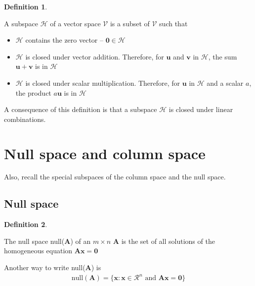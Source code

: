\documentclass[
]{book}
\theoremstyle{definition}
\newtheorem{definition}{Definition}[chapter]
\theoremstyle{definition}
\theoremstyle{definition}
\theoremstyle{remark}
\begin{document}
\begin{definition}
\protect\hypertarget{def:unlabeled-div-116}{}\label{def:unlabeled-div-116}

A subspace \(\mathcal{H}\) of a vector space \(\mathcal{V}\) is a subset of \(\mathcal{V}\) such that

\begin{itemize}
\item
  \(\mathcal{H}\) contains the zero vector -- \(\mathbf{0} \in \mathcal{H}\)
\item
  \(\mathcal{H}\) is closed under vector addition. Therefore, for \(\mathbf{u}\) and \(\mathbf{v}\) in \(\mathcal{H}\), the sum \(\mathbf{u} + \mathbf{v}\) is in \(\mathcal{H}\)
\item
  \(\mathcal{H}\) is closed under scalar multiplication. Therefore, for \(\mathbf{u}\) in \(\mathcal{H}\) and a scalar \(a\), the product \(a \mathbf{u}\) is in \(\mathcal{H}\)
\end{itemize}

\end{definition}

A consequence of this definition is that a subspace \(\mathcal{H}\) is closed under linear combinations.

\hypertarget{null-space-and-column-space}{%
\section{Null space and column space}\label{null-space-and-column-space}}

Also, recall the special subspaces of the column space and the null space.

\hypertarget{null-space}{%
\subsection{Null space}\label{null-space}}

\begin{definition}
\protect\hypertarget{def:unlabeled-div-117}{}\label{def:unlabeled-div-117}

The null space null(\(\mathbf{A}\)) of an \(m \times n\) \(\mathbf{A}\) is the set of all solutions of the homogeneous equation \(\mathbf{A} \mathbf{x} = \mathbf{0}\)

Another way to write null(\(\mathbf{A}\)) is
\[
\begin{aligned}
\mbox{null}(\mathbf{A}) = \{\mathbf{x} : \mathbf{x} \in \mathcal{R}^n \mbox{ and } \mathbf{A} \mathbf{x} = \mathbf{0} \}
\end{aligned}
\]

\end{definition}
\end{document}

